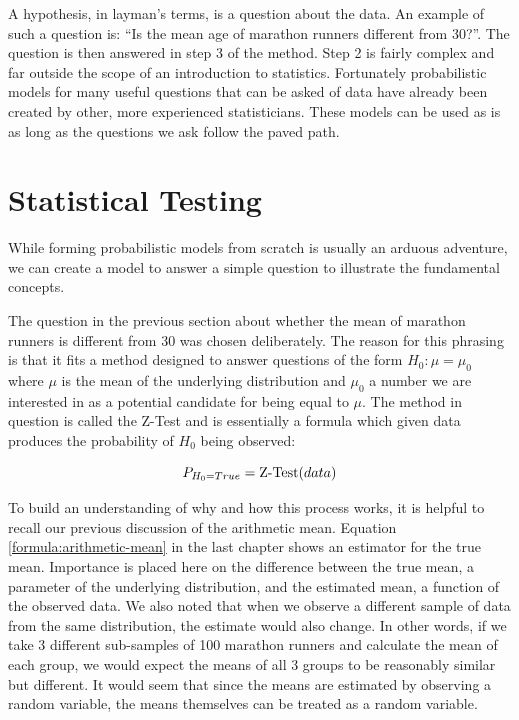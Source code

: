 \documentclass{tufte-book} %
\begin{document}
A hypothesis, in layman's terms, is a question about the data. An example of such a question is: ``Is the mean age of marathon runners different from 30?''. The question is then answered in step 3 of the method. Step 2 is fairly complex and far outside the scope of an introduction to statistics. Fortunately probabilistic models for many useful questions that can be asked of data have already been created by other, more experienced statisticians. These models can be used as is as long as the questions we ask follow the paved path.

\section{Statistical Testing}
While forming probabilistic models from scratch is usually an arduous adventure, we can create a model to answer a simple question to illustrate the fundamental concepts.

The question in the previous section about whether the mean of marathon runners is different from 30 was chosen deliberately. The reason for this phrasing is that it fits a method designed to answer questions of the form $H_0: \mu = \mu_0$ where $\mu$ is the mean of the underlying distribution and $\mu_0$ a number we are interested in as a potential candidate for being equal to $\mu$. The method in question is called the \hbox{Z-Test} and is essentially a formula which given data produces the probability of $H_0$ being observed:

\begin{equation}
P_{H_0 = True} = \hbox{Z-Test}(data)
\end{equation}

To build an understanding of why and how this process works, it is helpful to recall our previous discussion of the arithmetic mean. Equation \ref{formula:arithmetic-mean} in the last chapter shows an estimator for the true mean. Importance is placed here on the difference between the true mean, a parameter of the underlying distribution, and the estimated mean, a function of the observed data. We also noted that when we observe a different sample of data from the same distribution, the estimate would also change. In other words, if we take 3 different sub-samples of 100 marathon runners and calculate the mean of each group, we would expect the means of all 3 groups to be reasonably similar but different. It would seem that since the means are estimated by observing a random variable, the means themselves can be treated as a random variable. 
\end{document}
